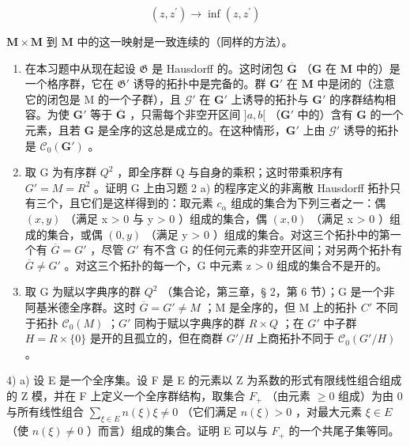 \[
(z, z ^ {\prime}) \rightarrow \inf (z, z ^ {\prime})
\]

\(\mathbf{M} \times \mathbf{M}\) 到 \(\mathbf{M}\) 中的这一映射是一致连续的（同样的方法）。

\begin{enumerate}
\def\labelenumi{\alph{enumi})}
\setcounter{enumi}{1}
\item
  在本习题中从现在起设 \(\mathfrak{G}\) 是 Hausdorff 的。这时闭包 \(\overline{\mathbf{G}}\) （\(\mathbf{G}\) 在 \(\mathbf{M}\) 中的）是一个格序群，它在 \(\mathfrak{G}'\) 诱导的拓扑中是完备的。群 \(\mathbf{G}'\) 在 \(\mathbf{M}\) 中是闭的（注意它的闭包是 M 的一个子群），且 \(\mathcal{G}'\) 在 \(\mathbf{G}'\) 上诱导的拓扑与 \(\mathbf{G}'\) 的序群结构相容。为使 \(\mathbf{G}'\) 等于 \(\overline{\mathbf{G}}\) ，只需每个非空开区间 \(]a, b[\) （\(\mathbf{G}'\) 中的）含有 \(\mathbf{G}\) 的一个元素，且若 \(\mathbf{G}\) 是全序的这总是成立的。在这种情形，\(\mathbf{G}'\) 上由 \(\mathcal{G}'\) 诱导的拓扑是 \(\mathcal{C}_0(\mathbf{G}')\) 。
\item
  取 G 为有序群 \(Q^{2}\) ，即全序群 Q 与自身的乘积；这时带乘积序有 \(G' = M = R^{2}\) 。证明 G 上由习题 2 a) 的程序定义的非离散 Hausdorff 拓扑只有三个，且它们是这样得到的：取元素 \(c_{\alpha}\) 组成的集合为下列三者之一：偶 \((x, y)\) （满足 x \textgreater{} 0 与 y \textgreater{} 0 ）组成的集合，偶 \((x, 0)\) （满足 x \textgreater{} 0 ）组成的集合，或偶 \((0, y)\) （满足 y \textgreater{} 0 ）组成的集合。对这三个拓扑中的第一个有 \(\overline{G} = G'\) ，尽管 \(G'\) 有不含 G 的任何元素的非空开区间；对另两个拓扑有 \(\overline{G} \neq G'\) 。对这三个拓扑的每一个，G 中元素 z \textgreater{} 0 组成的集合不是开的。
\item
  取 G 为赋以字典序的群 \(Q^{2}\) （集合论，第三章，§ 2，第 6 节）；G 是一个非阿基米德全序群。这时 \(\overline{G}=G'\neq M\) ；M 是全序的，但 M 上的拓扑 \(C'\) 不同于拓扑 \(\mathcal{C}_{0}(M)\) ；\(G'\) 同构于赋以字典序的群 \(R\times Q\) ；在 \(G'\) 中子群 \(H=R\times\{0\}\) 是开的且孤立的，但在商群 \(G'/H\) 上商拓扑不同于 \(\mathcal{C}_{0}(G'/H)\) 。
\end{enumerate}

4) a) 设 E 是一个全序集。设 F 是 E 的元素以 Z 为系数的形式有限线性组合组成的 Z 模，并在 F 上定义一个全序群结构，取集合 \(F_{+}\) （由元素 \(\geqslant 0\) 组成）为由 0 与所有线性组合 \(\sum_{\xi \in E} n(\xi) \xi \neq 0\) （它们满足 \(n(\xi) > 0\) ，对最大元素 \(\xi \in E\) （使 \(n(\xi) \neq 0\) ）而言）组成的集合。证明 E 可以与 \(F_{+}\) 的一个共尾子集等同。

